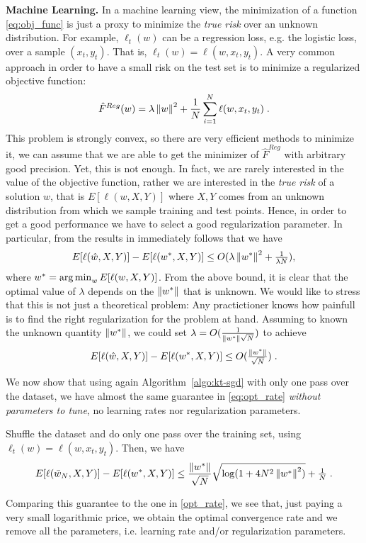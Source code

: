 \textbf{Machine Learning.} In a machine learning view, the minimization of a function \eqref{eq:obj_func} is just a proxy to minimize the \emph{true risk} over an unknown distribution. For example, $\ell_t(w)$ can be a regression loss, e.g. the logistic loss, over a sample $(x_t, y_t)$. That is, $\ell_t(w)=\ell(w,x_t,y_t)$. A very common approach in order to have a small risk on the test set is to minimize a regularized objective function:
\begin{equation}
\label{eq:reg_logloss}
\hat{F}^{Reg}(w) = \lambda \left\|{w}\right\|^2 + \frac{1}{N} \sum_{i=1}^N \ell(w,x_t,y_t) \; .
\end{equation}
This problem is strongly convex, so there are very efficient methods to minimize it, we can assume that we are able to get the minimizer of $\hat{F}^{Reg}$ with arbitrary good precision. Yet, this is not enough. In fact, we are rarely interested in the value of the objective function, rather we are interested in the \emph{true risk} of a solution $w$, that is $E[\ell(w,X,Y)]$ where $X,Y$ comes from an unknown distribution from which we sample training and test points.
Hence, in order to get a good performance we have to select a good regularization parameter. In particular, from the results in \cite{} immediately follows that we have
\[
E[\ell(\hat{w},X,Y)] - E[\ell(w^*,X,Y)] \leq O(\lambda \left\|{w^*}\right\|^2 + \tfrac{1}{\lambda N}),
\]
where $w^*=\operatorname*{arg\,min}_w E[\ell(w,X,Y)]$.
From the above bound, it is clear that the optimal value of $\lambda$ depends on the $\left\|{w^*}\right\|$ that is unknown. We would like to stress that this is not just a theoretical problem: Any practictioner knows how painfull is to find the right regularization for the problem at hand.
Assuming to known the unknown quantity $\left\|{w^*}\right\|$, we could set $\lambda = O(\tfrac{1}{\left\|{w^*}\right\| \sqrt{N}})$ to achieve
\begin{equation}
\label{eq:opt_rate}
E[\ell(\hat{w},X,Y)] - E[\ell(w^*,X,Y)] \leq O(\tfrac{\left\|{w^*}\right\|}{\sqrt{N}}) \; .
\end{equation}

We now show that using again Algorithm~\ref{algo:kt-sgd} with only one pass over the dataset, we have almost the same guarantee in \eqref{eq:opt_rate} \emph{without parameters to tune}, no learning rates nor regularization parameters.
\begin{theorem}
Shuffle the dataset and do only one pass over the training set, using $\ell_t(w)=\ell(w,x_t,y_t)$.
Then, we have 
\[
E[\ell(\bar{w}_N,X,Y)] - E[\ell(w^*,X,Y)] \leq \frac{\left\|{w^*}\right\|}{\sqrt{N}} \sqrt{\log(1+4 N^2 \left\|{w^*}\right\|^2)} +\tfrac{1}{N} \; .
\]
\end{theorem}
Comparing this guarantee to the one in \eqref{opt_rate}, we see that, just paying a very small logarithmic price, we obtain the optimal convergence rate and we remove all the parameters, i.e. learning rate and/or regularization parameters.